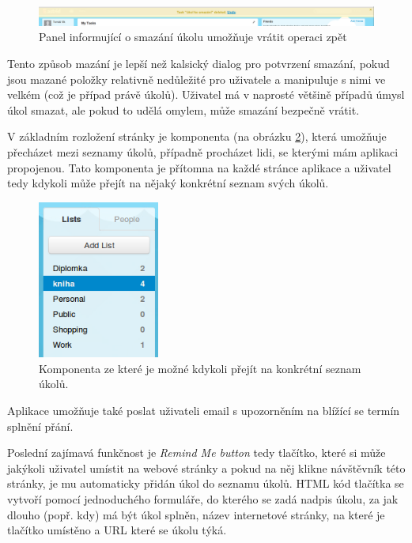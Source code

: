 \begin{figure}[htb]
\begin{center}
\includegraphics[width=130mm]{./pictures/astrid-undo.png}
\caption{Panel informující o smazání úkolu umožňuje vrátit operaci zpět}
\label{fig:astrid-undo}
\end{center}
\end{figure}


Tento způsob mazání je lepší než kalsický dialog pro potvrzení smazání, pokud jsou mazané položky relativně nedůležité pro uživatele a manipuluje s nimi ve velkém (což je případ právě úkolů). Uživatel má v naprosté většině případů úmysl úkol smazat, ale pokud to udělá omylem, může smazání bezpečně vrátit. 

V základním rozložení stránky je komponenta (na obrázku \ref{fig:astrid-tasklist}), která umožňuje přecházet mezi seznamy úkolů, případně procházet lidi, se kterými mám aplikaci propojenou. Tato komponenta je přítomna na každé stránce aplikace a uživatel tedy kdykoli může přejít na nějaký konkrétní seznam svých úkolů.

\begin{figure}[htb]
\begin{center}
\includegraphics[width=40mm]{./pictures/astrid-tasklist.png}
\caption{Komponenta ze které je možné kdykoli přejít na konkrétní seznam úkolů.}
\label{fig:astrid-tasklist}
\end{center}
\end{figure}

Aplikace umožňuje také poslat uživateli email s upozorněním na blížící se termín splnění přání.

Poslední zajímavá funkčnost je \emph{Remind Me button} tedy tlačítko, které si může jakýkoli uživatel umístit na webové stránky a pokud na něj klikne návštěvník této stránky, je mu automaticky přidán úkol do seznamu úkolů. HTML kód tlačítka se vytvoří pomocí jednoduchého formuláře, do kterého se zadá nadpis úkolu, za jak dlouho (popř. kdy) má být úkol splněn, název internetové stránky, na které je tlačítko umístěno a URL které se úkolu týká.

